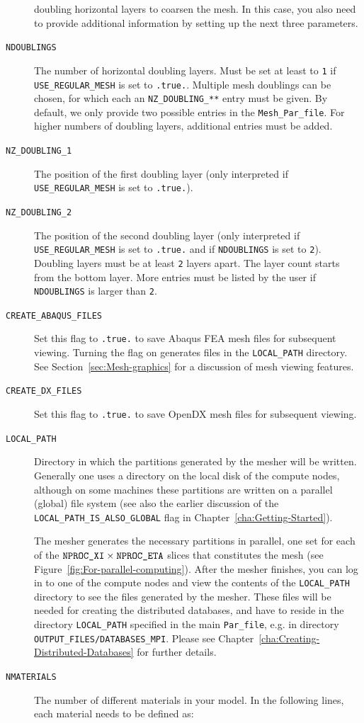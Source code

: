 \begin{description}
doubling horizontal layers to coarsen the mesh. In this case, you
also need to provide additional information by setting up the next
three parameters.
%
\item [{\texttt{NDOUBLINGS}}] The number of horizontal doubling layers.
Must be set at least to \texttt{1} if \texttt{USE\_REGULAR\_MESH} is set to \texttt{.true.}.
Multiple mesh doublings can be chosen, for which each an \texttt{NZ\_DOUBLING\_**} entry must be given.
By default, we only provide two possible entries in the \texttt{Mesh\_Par\_file}.
For higher numbers of doubling layers, additional entries must be added.
\item [{\texttt{NZ\_DOUBLING\_1}}] The position of the first doubling layer
(only interpreted if \texttt{USE\_REGULAR\_MESH} is set to \texttt{.true.}).
\item [{\texttt{NZ\_DOUBLING\_2}}] The position of the second doubling
layer (only interpreted if \texttt{USE\_REGULAR\_MESH} is set to \texttt{.true.}
and if \texttt{NDOUBLINGS} is set to \texttt{2}). Doubling layers must be at least \texttt{2} layers apart.
The layer count starts from the bottom layer.
More entries must be listed by the user if \texttt{NDOUBLINGS} is larger than \texttt{2}.
\item [{\texttt{CREATE\_ABAQUS\_FILES}}] Set this flag to \texttt{.true.}
to save Abaqus FEA  mesh files
for subsequent viewing. Turning the flag on generates files in the
\texttt{LOCAL\_PATH} directory. See Section~\ref{sec:Mesh-graphics}
for a discussion of mesh viewing features.
\item [{\texttt{CREATE\_DX\_FILES}}] Set this flag to \texttt{.true.} to
save OpenDX  mesh files for subsequent
viewing.
\item [{\texttt{LOCAL\_PATH}}] Directory in which the partitions generated
by the mesher will be written. Generally one uses a directory on the
local disk of the compute nodes, although on some machines these partitions
are written on a parallel (global) file system (see also the earlier
discussion of the \texttt{LOCAL\_PATH\_IS\_ALSO\_GLOBAL} flag in Chapter~\ref{cha:Getting-Started}).

The mesher generates the necessary partitions in parallel, one set
for each of the $\mbox{\texttt{NPROC\_XI\/}}\times\mbox{\texttt{NPROC\_ETA\/}}$ slices that constitutes
the mesh (see Figure~\ref{fig:For-parallel-computing}). After the
mesher finishes, you can log in to one of the compute nodes and view
the contents of the \texttt{LOCAL\_PATH} directory to see the files
generated by the mesher. These files will be needed for creating the
distributed databases, and have to reside in the directory \texttt{LOCAL\_PATH}
specified in the main \texttt{Par\_file}, e.g. in directory \texttt{OUTPUT\_FILES/DATABASES\_MPI}.
Please see Chapter~\ref{cha:Creating-Distributed-Databases} for
further details.
%
\item [{\texttt{NMATERIALS}}] The number of different materials in your
model. In the following lines, each material needs to be defined as:


\end{description}
